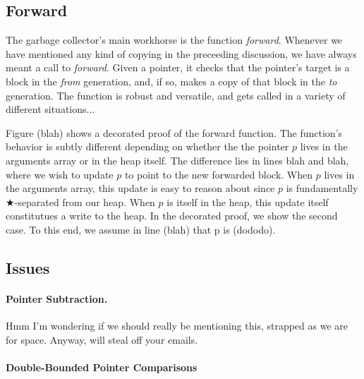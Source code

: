 \subsection{Forward}
\label{sec:gcforward}
The garbage collector's main workhorse is the function \emph{forward}.
Whenever we have mentioned any kind of copying in the preceeding 
discussion, we have always meant a call to \emph{forward}. 
Given a pointer, it checks that the pointer's target is a block
in the \emph{from} generation, and, if so, 
makes a copy of that block in the \emph{to} generation. The function 
is robust and versatile, and gets called in a variety of different 
situations... 

Figure (blah) shows a decorated proof of the forward function.
The function's behavior is subtly different depending on 
whether the the pointer $p$ lives in the arguments array or in the 
heap itself. The difference lies in lines blah and blah, where 
we wish to update $p$ to point to the new forwarded block. 
When $p$ lives in the arguments array, this update is easy to 
reason about since $p$ is fundamentally $\bigstar$-separated from our heap. 
When $p$ is itself in the heap, this update itself constitutues a
write to the heap. In the decorated proof, we show the second 
case. To this end, we assume in line (blah) that p is (dododo). 



\subsection{Issues}
\label{sec:gccsemantics}

\paragraph{Pointer Subtraction.}
{\color{blue}Hmm I'm wondering if we should really be mentioning this,
strapped as we are for space. Anyway, will steal off your emails.}


\paragraph{Double-Bounded Pointer Comparisons}







